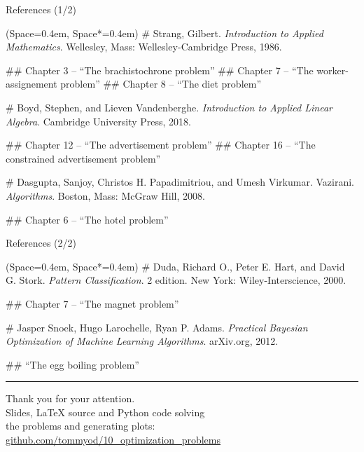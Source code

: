 \documentclass[11pt, aspectratio=149]{beamer}
\newcommand{\listSpace}{0.4em}
\theoremstyle{plain}
\begin{document}
\begin{frame}[fragile, t]{References (1/2)}
	\vspace{1em}
	\small
	\begin{easylist}[itemize]
		\ListProperties(Space=\listSpace, Space*=\listSpace)
		# Strang, Gilbert. \emph{Introduction to Applied Mathematics}. Wellesley, Mass: Wellesley-Cambridge Press, 1986.
		 
		## Chapter 3 -- ``The brachistochrone problem''
		## Chapter 7 -- ``The worker-assignement problem''
		## Chapter 8 -- ``The diet problem''
		
		# Boyd, Stephen, and Lieven Vandenberghe. \emph{Introduction to Applied Linear Algebra}. Cambridge University Press, 2018.
		 
		## Chapter 12 -- ``The advertisement problem''
		## Chapter 16 -- ``The constrained advertisement problem''
		
		# Dasgupta, Sanjoy, Christos H. Papadimitriou, and Umesh Virkumar. Vazirani. \emph{Algorithms}. Boston, Mass: McGraw Hill, 2008.
		
		## Chapter 6 -- ``The hotel problem''
	\end{easylist}
	\normalsize
\end{frame}

\begin{frame}[fragile, t]{References (2/2)}
	\vspace{1em}
	\small
	\begin{easylist}[itemize]
		\ListProperties(Space=\listSpace, Space*=\listSpace)
		# Duda, Richard O., Peter E. Hart, and David G. Stork. \emph{Pattern Classification}. 2 edition. New York: Wiley-Interscience, 2000.
		
		## Chapter 7 -- ``The magnet problem''
		
		# Jasper Snoek, Hugo Larochelle, Ryan P. Adams. \emph{Practical Bayesian Optimization of Machine Learning Algorithms}. arXiv.org, 2012.
		
		## ``The egg boiling problem''
	\end{easylist}
	\normalsize
	\vspace*{1em}
	\hrule
	
\begin{center}
	{\Large Thank you for your attention.} \\
	\vspace*{1em}
	Slides, \LaTeX{} source and Python code solving \\the problems and generating plots: \\
	\vspace*{1em}
	\url{github.com/tommyod/10_optimization_problems}
\end{center}
\end{frame}
\end{document}
